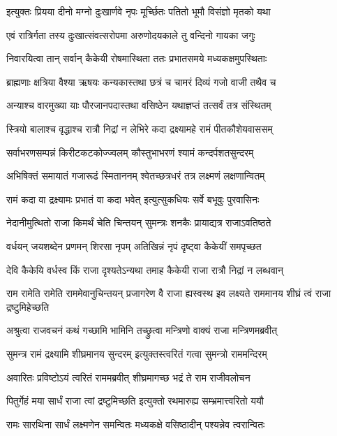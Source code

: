 \twolineshloka
{इत्युक्तः प्रियया दीनो मग्नो दुःखार्णवे नृपः}
{मूर्च्छितः पतितो भूमौ विसंज्ञो मृतको यथा} %

\twolineshloka
{एवं रात्रिर्गता तस्य दुःखात्संवत्सरोपमा}
{अरुणोदयकाले तु वन्दिनो गायका जगुः} %

\twolineshloka
{निवारयित्वा तान् सर्वान् कैकेयी रोषमास्थिता}
{ततः प्रभातसमये मध्यकक्षमुपस्थिताः} %

\twolineshloka
{ब्राह्मणाः क्षत्रिया वैश्या ऋषयः कन्यकास्तथा}
{छत्रं च चामरं दिव्यं गजो वाजी तथैव च} %

\twolineshloka
{अन्याश्च वारमुख्या याः पौरजानपदास्तथा}
{वसिष्ठेन यथाज्ञप्तं तत्सर्वं तत्र संस्थितम्} %

\twolineshloka
{स्त्रियो बालाश्च वृद्धाश्च रात्रौ निद्रां न लेभिरे}
{कदा द्रक्ष्यामहे रामं पीतकौशेयवाससम्} %

\twolineshloka
{सर्वाभरणसम्पन्नं किरीटकटकोज्ज्वलम्}
{कौस्तुभाभरणं श्यामं कन्दर्पशतसुन्दरम्} %

\twolineshloka
{अभिषिक्तं समायातं गजारूढं स्मिताननम्}
{श्वेतच्छत्रधरं तत्र लक्ष्मणं लक्षणान्वितम्} %

\twolineshloka
{रामं कदा वा द्रक्ष्यामः प्रभातं वा कदा भवेत्}
{इत्युत्सुकधियः सर्वे बभूवुः पुरवासिनः} %

\twolineshloka
{नेदानीमुत्थितो राजा किमर्थं चेति चिन्तयन्}
{सुमन्त्रः शनकैः प्रायाद्यत्र राजाऽवतिष्ठते} %

\twolineshloka
{वर्धयन् जयशब्देन प्रणमन् शिरसा नृपम्}
{अतिखिन्नं नृपं दृष्ट्वा कैकेयीं समपृच्छत} %

\twolineshloka
{देवि कैकेयि वर्धस्व किं राजा दृश्यतेऽन्यथा}
{तमाह कैकेयी राजा रात्रौ निद्रां न लब्धवान्} %

\threelineshloka
{राम रामेति रामेति राममेवानुचिन्तयन्}
{प्रजागरेण वै राजा ह्यस्वस्थ इव लक्ष्यते}
{राममानय शीघ्रं त्वं राजा द्रष्टुमिहेच्छति} %

\twolineshloka
{अश्रुत्वा राजवचनं कथं गच्छामि भामिनि}
{तच्छ्रुत्वा मन्त्रिणो वाक्यं राजा मन्त्रिणमब्रवीत्} %

\twolineshloka
{सुमन्त्र रामं द्रक्ष्यामि शीघ्रमानय सुन्दरम्}
{इत्युक्तस्त्वरितं गत्वा सुमन्त्रो राममन्दिरम्} %

\twolineshloka
{अवारितः प्रविष्टोऽयं त्वरितं राममब्रवीत्}
{शीघ्रमागच्छ भद्रं ते राम राजीवलोचन} %

\twolineshloka
{पितुर्गेहं मया सार्धं राजा त्वां द्रष्टुमिच्छति}
{इत्युक्तो रथमारुह्य सम्भ्रमात्त्वरितो ययौ} %

\twolineshloka
{रामः सारथिना सार्धं लक्ष्मणेन समन्वितः}
{मध्यकक्षे वसिष्ठादीन् पश्यन्नेव त्वरान्वितः} %

